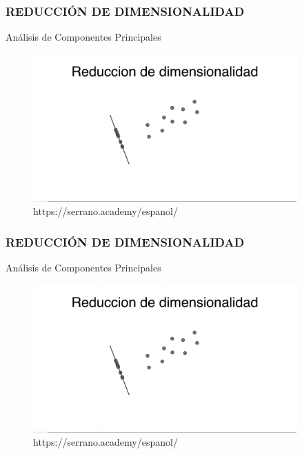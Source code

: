 \documentclass{beamer}
\begin{document}
\begin{frame}
	\frametitle{REDUCCIÓN DE DIMENSIONALIDAD}
	\begin{block}{Análisis de Componentes Principales}	
		\begin{figure}
			\includegraphics[width=0.9\textwidth]{PCA/IMG_3531.jpg}
			\caption{https://serrano.academy/espanol/}
		\end{figure}
	\end{block}
\end{frame}

\begin{frame}
	\frametitle{REDUCCIÓN DE DIMENSIONALIDAD}
	\begin{block}{Análisis de Componentes Principales}	
		\begin{figure}
			\includegraphics[width=0.9\textwidth]{PCA/IMG_3531.jpg}
			\caption{https://serrano.academy/espanol/}
		\end{figure}
	\end{block}
\end{frame}
\end{document}
